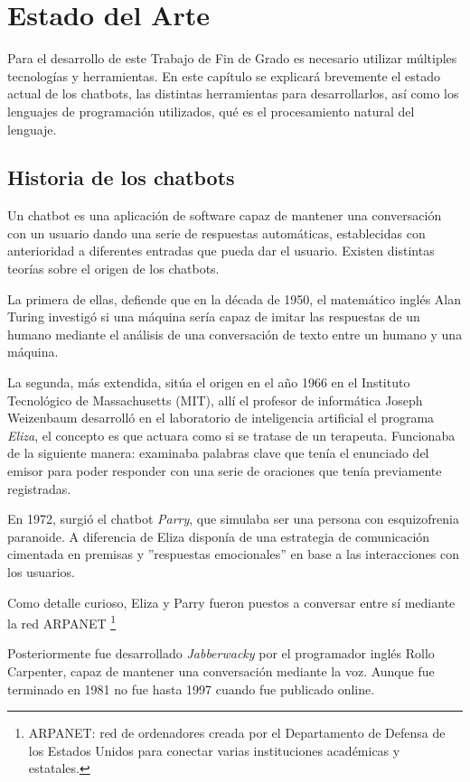 \chapter{Estado del Arte}

Para el desarrollo de este Trabajo de Fin de Grado es necesario utilizar múltiples tecnologías y herramientas. En este capítulo se explicará brevemente el estado actual de los chatbots, las distintas herramientas para desarrollarlos, así como los lenguajes de programación utilizados, qué es el procesamiento natural del lenguaje.


\section{Historia de los chatbots}

Un chatbot es una aplicación de software capaz de mantener una conversación con un usuario dando una serie de respuestas automáticas, establecidas con anterioridad a diferentes entradas que pueda dar el usuario. Existen distintas teorías sobre el origen de los chatbots. 

La primera de ellas, defiende que en la década de 1950, el matemático inglés Alan Turing investigó si una máquina sería capaz de imitar las respuestas de un humano mediante el análisis de una conversación de texto entre un humano y una máquina. 

La segunda, más extendida, sitúa el origen en el año 1966 en el Instituto Tecnológico de Massachusetts (MIT), allí el profesor de informática Joseph Weizenbaum desarrolló en el laboratorio de inteligencia artificial el programa \textit{Eliza}, el concepto es que actuara como si se tratase de un terapeuta. Funcionaba de la siguiente manera: examinaba palabras clave que tenía el enunciado del emisor para poder responder con una serie de oraciones que tenía previamente registradas.

En 1972, surgió el chatbot \textit{Parry}, que simulaba ser una persona con esquizofrenia paranoide. A diferencia de Eliza disponía de una estrategia de comunicación cimentada en premisas y ''respuestas emocionales'' en base a las interacciones con los usuarios. \cite{StreamGenerator}

Como detalle curioso, Eliza y Parry fueron puestos a conversar entre sí mediante la red ARPANET \footnote{ARPANET: red de ordenadores creada por el Departamento de Defensa de los Estados Unidos para conectar varias instituciones académicas y estatales.}  

Posteriormente fue desarrollado \textit{Jabberwacky} por el programador inglés Rollo Carpenter, capaz de mantener una conversación mediante la voz. Aunque fue terminado en 1981 no fue hasta 1997 cuando fue publicado online.

